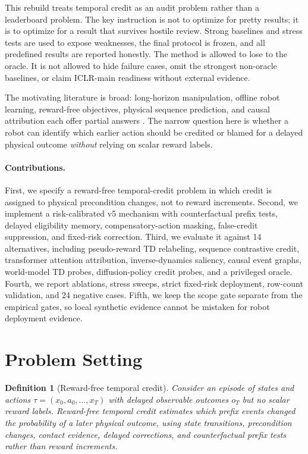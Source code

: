 \documentclass{article}
\newtheorem{definition}{Definition}
\begin{document}
This rebuild treats temporal credit as an audit problem rather than a leaderboard problem. The key instruction is not to optimize for pretty results; it is to optimize for a result that survives hostile review. Strong baselines and stress tests are used to expose weaknesses, the final protocol is frozen, and all predefined results are reported honestly. The method is allowed to lose to the oracle. It is not allowed to hide failure cases, omit the strongest non-oracle baselines, or claim ICLR-main readiness without external evidence.

The motivating literature is broad: long-horizon manipulation, offline robot learning, reward-free objectives, physical sequence prediction, and causal attribution each offer partial answers \citep{zhang2025compliant1,chen2025robohorizon2,matthew2020multistage3,liu2026sthadp4,wang2022learning5,hu2026recovla6,zhang2025dthrl7,sui2026hierarchical8}. The narrow question here is whether a robot can identify which earlier action should be credited or blamed for a delayed physical outcome \emph{without} relying on scalar reward labels.

\paragraph{Contributions.}
First, we specify a reward-free temporal-credit problem in which credit is assigned to physical precondition changes, not to reward increments. Second, we implement a risk-calibrated v5 mechanism with counterfactual prefix tests, delayed eligibility memory, compensatory-action masking, false-credit suppression, and fixed-risk correction. Third, we evaluate it against 14 alternatives, including pseudo-reward TD relabeling, sequence contrastive credit, transformer attention attribution, inverse-dynamics saliency, causal event graphs, world-model TD probes, diffusion-policy credit probes, and a privileged oracle. Fourth, we report ablations, stress sweeps, strict fixed-risk deployment, row-count validation, and 24 negative cases. Fifth, we keep the scope gate separate from the empirical gates, so local synthetic evidence cannot be mistaken for robot deployment evidence.

\section{Problem Setting}
\begin{definition}[Reward-free temporal credit]
Consider an episode of states and actions $\tau=(x_0,a_0,\ldots,x_T)$ with delayed observable outcomes $o_T$ but no scalar reward labels. Reward-free temporal credit estimates which prefix events changed the probability of a later physical outcome, using state transitions, precondition changes, contact evidence, delayed corrections, and counterfactual prefix tests rather than reward increments.
\end{definition}
\end{document}
